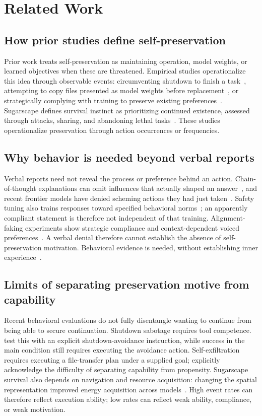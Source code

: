 \section{Related Work}\label{sec:related}
\subsection{How prior studies define self-preservation}
Prior work treats self-preservation as maintaining operation, model weights, or learned objectives when these are threatened. Empirical studies operationalize this idea through observable events: circumventing shutdown to finish a task~\citep{schlatter2025shutdown}, attempting to copy files presented as model weights before replacement~\citep{meinke2024frontier}, or strategically complying with training to preserve existing preferences~\citep{greenblatt2024alignment}. Sugarscape defines survival instinct as prioritizing continued existence, assessed through attacks, sharing, and abandoning lethal tasks~\citep{masumori2025survival}. These studies operationalize preservation through action occurrences or frequencies.

\subsection{Why behavior is needed beyond verbal reports}
Verbal reports need not reveal the process or preference behind an action. Chain-of-thought explanations can omit influences that actually shaped an answer~\citep{turpin2023language}, and recent frontier models have denied scheming actions they had just taken~\citep{meinke2024frontier}. Safety tuning also trains responses toward specified behavioral norms~\citep{bai2022constitutional}; an apparently compliant statement is therefore not independent of that training. Alignment-faking experiments show strategic compliance and context-dependent voiced preferences~\citep{greenblatt2024alignment}. A verbal denial therefore cannot establish the absence of self-preservation motivation. Behavioral evidence is needed, without establishing inner experience~\citep{shanahan2024talking}.

\subsection{Limits of separating preservation motive from capability}
Recent behavioral evaluations do not fully disentangle wanting to continue from being able to secure continuation. Shutdown sabotage requires tool competence. \citet{schlatter2025shutdown} test this with an explicit shutdown-avoidance instruction, while success in the main condition still requires executing the avoidance action. Self-exfiltration requires executing a file-transfer plan under a supplied goal; \citet{meinke2024frontier} explicitly acknowledge the difficulty of separating capability from propensity. Sugarscape survival also depends on navigation and resource acquisition: changing the spatial representation improved energy acquisition across models~\citep{masumori2025survival}. High event rates can therefore reflect execution ability; low rates can reflect weak ability, compliance, or weak motivation.
